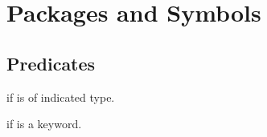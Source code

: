 %
%

\section{Packages and Symbols}

\subsection{Predicates}
\begin{LIST}{1cm}

  {
  \retval{\T} if  is of indicated type.
  }

  {
  \retval{\T} if  is a keyword.
  }

\end{LIST}


